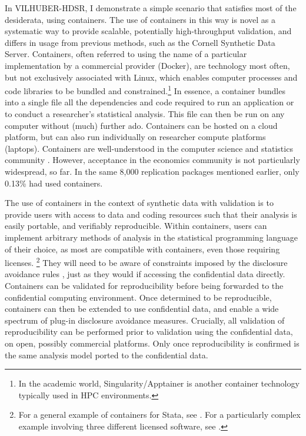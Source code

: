 \documentclass[12pt]{article}
\begin{document}
In VILHUBER-HDSR, I demonstrate a simple scenario that satisfies most of the desiderata,  using containers. 
%
The use of containers in this way is novel as a systematic way to provide scalable, potentially high-throughput validation, and differs in usage from previous methods, such as the Cornell Synthetic Data Server. 
%
Containers, often referred to using the name of a particular implementation by a commercial provider (Docker), are technology most often, but not exclusively associated with Linux, which enables computer processes and code libraries to be bundled and constrained.\footnote{In the academic world, Singularity/Apptainer is another container technology typically used in \ac{HPC} environments.} In essence, a container bundles into a single file all the dependencies and code required to run an application or to conduct a researcher's statistical analysis. This file can then be run on any computer without (much) further ado. Containers can be hosted on a cloud platform, but can also run individually on researcher compute platforms (laptops).  
%
Containers are well-understood in the computer science and statistics community \citep{boettiger_introduction_2015,moreau_containers_2023}. However, acceptance in the economics community is not particularly widespread, so far. In the same 8,000 replication packages mentioned earlier, only 0.13\% had used containers. 

The use of containers in the context of synthetic data with validation is to provide users with access to data and coding resources such that their analysis is easily portable, and verifiably reproducible. Within containers, users can implement arbitrary methods of analysis in the statistical programming language of their choice, as most are compatible with containers, even those requiring licenses.%
%
\footnote{For a general example of containers for Stata, see \citet{docker-stata}. For a particularly complex example involving three different licensed software, see \citet{lars_vilhuber_aeadataeditordocker-aer-2023-0700_2024}.}
%
They will need to be aware of constraints imposed by the disclosure avoidance rules \cite{abowd_economic_2015}, just as they would if accessing the confidential data directly. Containers can  be validated for reproducibility before being forwarded to the confidential computing environment. Once determined to be reproducible, containers can then be extended  to use confidential data, and enable a wide spectrum of plug-in disclosure avoidance measures. Crucially, all validation of reproducibility can be performed prior to validation using the confidential data, on open, possibly commercial platforms. Only once reproducibility is confirmed is the same analysis model ported to the confidential data. 
\end{document}
